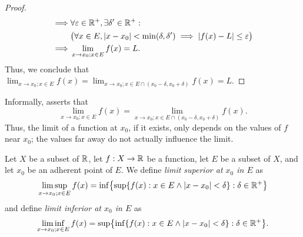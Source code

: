 \begin{proof}
\begin{align*}
    \implies & \forall \varepsilon \in \mathbb{R}^+, \exists \delta' \in \mathbb{R}^+ :                                                                              \\
             & \big(\forall x \in E, \left\lvert x - x_0\right\rvert < \min(\delta, \delta') \implies \left\lvert f(x) - L\right\rvert \leq \varepsilon\big)                             \\
    \implies & \lim_{x \to x_0 ; x \in E} f(x) = L.
  \end{align*}
  Thus, we conclude that \(\lim_{x \to x_0 ; x \in E} f(x) = \lim_{x \to x_0 ; x \in E \cap (x_0 - \delta, x_0 + \delta)} f(x) = L\).
\end{proof}

\begin{note}
  Informally,  asserts that
  \[
    \lim_{x \to x_0 ; x \in E} f(x) = \lim_{x \to x_0 ; x \in E \cap (x_0 - \delta, x_0 + \delta)} f(x).
  \]
  Thus, the limit of a function at \(x_0\), if it exists, only depends on the values of \(f\) near \(x_0\);
  the values far away do not actually influence the limit.
\end{note}

\begin{ac}\label{i:ac:9.3.1}
  Let \(X\) be a subset of \(\mathbb{R}\), let \(f : X \to \mathbb{R}\) be a function, let \(E\) be a subset of \(X\), and let \(x_0\) be an adherent point of \(E\).
  We define \emph{limit superior at \(x_0\) in \(E\)} as
  \[
    \limsup_{x \to x_0 ; x \in E} f(x) = \inf\set{\sup\set{f(x) : x \in E \land \abs{x - x_0} < \delta} : \delta \in \R^+}
  \]
  and define \emph{limit inferior at \(x_0\) in \(E\)} as
  \[
    \liminf_{x \to x_0 ; x \in E} f(x) = \sup\set{\inf\set{f(x) : x \in E \land \abs{x - x_0} < \delta} : \delta \in \R^+}.
  \]
\end{ac}

